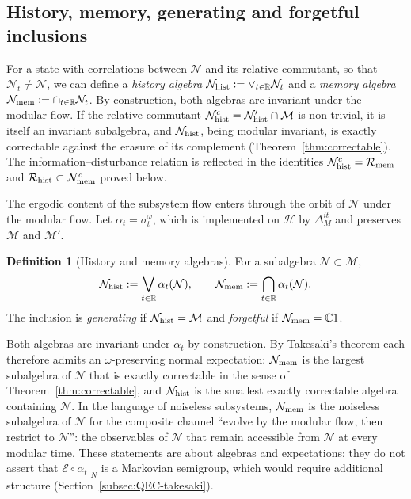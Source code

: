 \documentclass[a4paper,11pt]{article}
\theoremstyle{definition}
\newtheorem{definition}{Definition}[section]
\newcommand{\mE}{\mathcal{E}}
\begin{document}
\subsection{History, memory, generating and forgetful inclusions}\label{subsec:QEC-history-memory}

For a state with correlations between $\mathcal N$ and its relative commutant, so that $\mathcal N_t\ne\mathcal N$, we can define a {\it history algebra} $\mathcal N_{\rm hist}:=\vee_{t\in\mathbb{R}}\mathcal N_t$ and a {\it memory algebra} $\mathcal N_{\rm mem}:=\cap_{t\in\mathbb{R}}\mathcal N_t$. By construction, both algebras are invariant under the modular flow. If the relative commutant $\mathcal N_{\rm hist}^c=\mathcal N'_{\rm hist}\cap \mathcal M$ is non-trivial, it is itself an invariant subalgebra, and $\mathcal N_{\rm hist}$, being modular invariant, is exactly correctable against the erasure of its complement (Theorem~\ref{thm:correctable}). The information--disturbance relation is reflected in the identities $\mathcal N_{\rm hist}^c=\mathcal R_{\rm mem}$ and $\mathcal R_{\rm hist}\subset \mathcal N_{\rm mem}^c$ proved below.



The ergodic content of the subsystem flow enters through the orbit of $\mathcal N$ under the modular flow. Let $\alpha_t=\sigma^{\omega}_t$, which is implemented on $\mathcal H$ by $\Delta_M^{it}$ and preserves $\mathcal M$ and $\mathcal M'$.

\begin{definition}[History and memory algebras]\label{def:history-memory}
For a subalgebra $\mathcal N\subset\mathcal M$,
\begin{equation}
 \mathcal N_{\rm hist}:=\bigvee_{t\in\mathbb R}\alpha_t(\mathcal N),\qquad
 \mathcal N_{\rm mem}:=\bigcap_{t\in\mathbb R}\alpha_t(\mathcal N).
\end{equation}
The inclusion is \emph{generating} if $\mathcal N_{\rm hist}=\mathcal M$  and \emph{forgetful} if $\mathcal N_{\rm mem}=\mathbb C1$.
\end{definition}

Both algebras are invariant under $\alpha_t$ by construction. By Takesaki's theorem each therefore admits an $\omega$-preserving normal expectation: $\mathcal N_{\rm mem}$ is the largest subalgebra of $\mathcal N$ that is exactly correctable in the sense of Theorem~\ref{thm:correctable}, and $\mathcal N_{\rm hist}$ is the smallest exactly correctable algebra containing $\mathcal N$. In the language of noiseless subsystems, $\mathcal N_{\rm mem}$ is the noiseless subalgebra of $\mathcal N$ for the composite channel ``evolve by the modular flow, then restrict to $\mathcal N$'': the observables of $\mathcal N$ that remain accessible from $\mathcal N$ at every modular time. These statements are about algebras and expectations; they do not assert that $\mE\circ\alpha_t|_N$ is a Markovian semigroup, which would require additional structure (Section~\ref{subsec:QEC-takesaki}).
\end{document}

